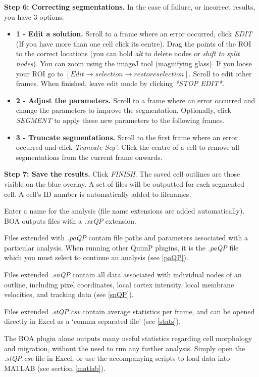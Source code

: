 \documentclass[a4paper,12pt]{article}
\begin{document}
\textbf{Step 6: Correcting segmentations.}  In the case of failure, or incorrect results, you have 3 options:

\begin{itemize}
\item \textbf{1 - Edit a solution.} Scroll to a frame where an error occurred, click \textit{EDIT} (If you have more than one cell
click its centre). Drag the points of the ROI to the correct locations (you can hold \textit{alt} to delete nodes or \textit{shift to split nodes}).
You can zoom using the imageJ tool (magnifying glass). If you loose your ROI go to $[Edit\rightarrow selection\rightarrow restore selection]$.
Scroll to edit other frames.  When finished, leave edit mode by clicking \textit{*STOP EDIT*}.
\item \textbf{2 - Adjust the parameters.}  Scroll to a frame where an error occurred and change the parameters to improve the segmentation.
Optionally, click \textit{SEGMENT} to apply these new parameters to the following frames.
\item \textbf{3 - Truncate segmentations.}  Scroll to the first frame where an error occurred and click \textit{Truncate Seg'}.  Click the centre
of a cell to remove all segmentations from the current frame onwards.
\end{itemize}


\textbf{Step 7: Save the results.}  Click \textit{FINISH}.  The saved cell outlines are those visible on the blue overlay.
A set of files will be outputted for each segmented cell.  A cell's ID number is automatically added to filenames.

Enter a name for the analysis (file name extensions are added automatically). BOA outputs files with a \textit{.xxQP} extension.

Files extended  with \textit{.paQP} contain file paths and parameters associated with a particular analysis.  
When running other QuimP plugins, it is the \textit{.paQP} file which you must select to continue an analysis (see \ref{paQP}).

Files extended \textit{.snQP} contain all data associated with individual nodes of an outline, including pixel coordinates, local cortex 
intensity, local membrane velocities, and tracking data (see \ref{snQP}).

Files extended \textit{.stQP.csv} contain average statistics per frame, and can be opened directly in 
Excel as a `comma separated file'  (see \ref{stats}).

The BOA plugin alone outputs many useful statistics regarding cell morphology and migration, without the need to run any further analysis.
Simply open the \textit{.stQP.csv} file in Excel, or use the accompanying scripts to load data into MATLAB (see section \ref{matlab}).
\end{document}

